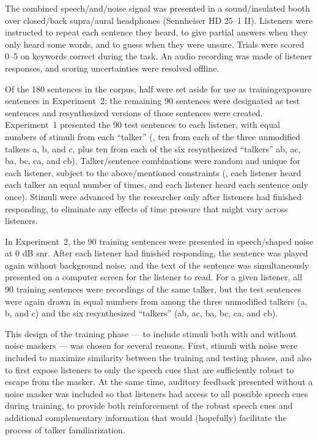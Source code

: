 The combined speech\-/and\-/noise signal was presented in a sound\-/insulated booth over closed\-/back supra\-/aural headphones (Sennheiser HD 25–1 II).  Listeners were instructed to repeat each sentence they heard, to give partial answers when they only heard some words, and to guess when they were unsure.  Trials were scored 0–5 on keywords correct during the task.  An audio recording was made of listener responses, and scoring uncertainties were resolved offline.  

Of the 180 sentences in the corpus, half were set aside for use as training\slsh exposure sentences in Experiment~2; the remaining 90 sentences were designated as test sentences and resynthesized versions of those sentences were created.  Experiment~1 presented the 90 test sentences to each listener, with equal numbers of stimuli from each “talker” (\ie, ten from each of the three unmodified talkers \ac{a}, \ac{b}, and \ac{c}, plus ten from each of the six resynthesized “talkers” \ac{ab}, \ac{ac}, \ac{ba}, \ac{bc}, \ac{ca}, and \ac{cb}).  Talker\-/sentence combinations were random and unique for each listener, subject to the above\-/mentioned constraints (\ie, each listener heard each talker an equal number of times, and each listener heard each sentence only once).  Stimuli were advanced by the researcher only after listeners had finished responding, to eliminate any effects of time pressure that might vary across listeners.

In Experiment~2, the 90 training sentences were presented in speech\-/shaped noise at 0 dB \ac{snr}.  After each listener had finished responding, the sentence was played again without background noise, and the text of the sentence was simultaneously presented on a computer screen for the listener to read.  For a given listener, all 90 training sentences were recordings of the same talker, but the test sentences were again drawn in equal numbers from among the three unmodified talkers (\ac{a}, \ac{b}, and \ac{c}) and the six resynthesized “talkers” (\ac{ab}, \ac{ac}, \ac{ba}, \ac{bc}, \ac{ca}, and \ac{cb}).

This design of the training phase — to include stimuli both with and without noise maskers — was chosen for several reasons.  First, stimuli with noise were included to maximize similarity between the training and testing phases, and also to first expose listeners to only the speech cues that are sufficiently robust to escape from the masker.  At the same time, auditory feedback presented without a noise masker was included so that listeners had access to all possible speech cues during training, to provide both reinforcement of the robust speech cues and additional complementary information that would (hopefully) facilitate the process of talker familiarization.

